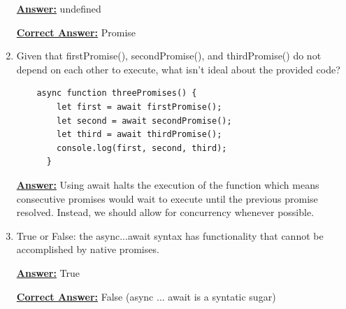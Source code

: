 \documentclass[12pt]{article}
\begin{document}
\begin{enumerate}
    \bigskip

    \underline{\textbf{Answer:}} undefined

    \bigskip

    \underline{\textbf{Correct Answer:}} Promise


    \item Given that firstPromise(), secondPromise(), and thirdPromise() do not depend on each other to execute, what isn’t ideal about the provided code?
    \bigskip

\begin{lstlisting}
    async function threePromises() {
        let first = await firstPromise();
        let second = await secondPromise();
        let third = await thirdPromise();
        console.log(first, second, third);
      }
\end{lstlisting}

    \bigskip

    \underline{\textbf{Answer:}} Using await halts the execution of the function which means consecutive promises would wait to execute until the previous promise resolved. Instead, we should allow for concurrency whenever possible.

    \item True or False: the async...await syntax has functionality that cannot be accomplished by native promises.

    \bigskip

    \underline{\textbf{Answer:}} True

    \bigskip

    \underline{\textbf{Correct Answer:}} False (async ... await is a syntatic sugar)

\end{enumerate}
\end{document}
